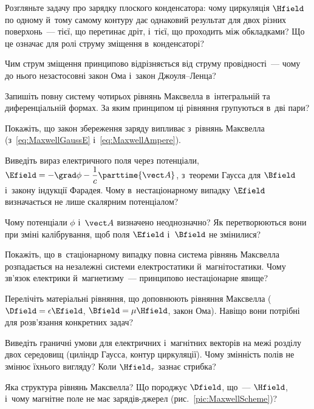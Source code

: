 \begin{Questions}
\begin{quizlist}
		\item Розгляньте задачу про зарядку плоского конденсатора: чому циркуляція
		  $\Hfield$ по одному й~тому самому контуру дає однаковий результат для двох
		  різних поверхонь~--- тієї, що перетинає дріт, і~тієї, що проходить між
		  обкладками? Що це означає для ролі струму зміщення в~конденсаторі?
		
		\item Чим струм зміщення принципово відрізняється від струму провідності~--- чому
		  до нього незастосовні закон Ома і~закон Джоуля--Ленца?
		
		\item Запишіть повну систему чотирьох рівнянь Максвелла в~інтегральній та
		  диференціальній формах. За яким принципом ці рівняння групуються в~дві пари?
		
		\item Покажіть, що закон збереження заряду випливає з~рівнянь Максвелла
		  (з~\eqref{eq:MaxwellGaussE} і~\eqref{eq:MaxwellAmpere}).
		
		\item Виведіть вираз електричного поля через потенціали, $\Efield = -\grad\phi -
		  \dfrac1c\parttime{\vect A}$, з~теореми Гаусса для $\Bfield$ і~закону індукції
		  Фарадея. Чому в~нестаціонарному випадку $\Efield$ визначається не лише скалярним
		  потенціалом?
		
		\item Чому потенціали $\phi$ і~$\vect A$ визначено неоднозначно? Як перетворюються
		  вони при зміні калібрування, щоб поля $\Efield$ і~$\Bfield$ не змінилися?
		
		\item Покажіть, що в~стаціонарному випадку повна система рівнянь Максвелла
		  розпадається на незалежні системи електростатики й~магнітостатики. Чому зв'язок
		  електрики й~магнетизму~--- принципово нестаціонарне явище?
		
		\item Перелічіть матеріальні рівняння, що доповнюють рівняння Максвелла
		  ($\Dfield=\epsilon\Efield$, $\Bfield=\mu\Hfield$, закон Ома). Навіщо вони
		  потрібні для розв'язання конкретних задач?
		
		\item Виведіть граничні умови для електричних і~магнітних векторів на межі розділу двох середовищ (циліндр Гаусса, контур циркуляції). Чому змінність полів не змінює їхнього вигляду? Коли $\Hfield_\tau$ зазнає стрибка?
		
		\item Яка структура рівнянь Максвелла? Що породжує $\Dfield$, що~--- $\Hfield$, і~чому магнітне поле не має зарядів-джерел (рис.~\ref{pic:MaxwellScheme})?
		

\end{quizlist}
\end{Questions}
